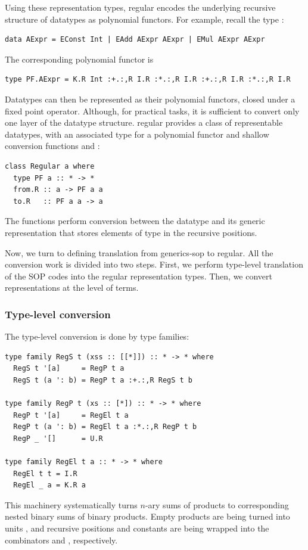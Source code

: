 \documentclass[sigplan,screen,review,anonymous]{acmart}
\begin{document}
Using these representation types, \textsf{regular} encodes the underlying recursive structure of datatypes as polynomial functors. For example, recall the type :
\begin{lstlisting}[style=fancy]
data AExpr = EConst Int | EAdd AExpr AExpr | EMul AExpr AExpr
\end{lstlisting}
The corresponding polynomial functor is
\begin{lstlisting}[style=fancy]
type PF.AExpr = K.R Int :+.:,R I.R :*.:,R I.R :+.:,R I.R :*.:,R I.R
\end{lstlisting}
Datatypes can then be represented as their polynomial functors, closed under a fixed point operator. Although, for practical tasks, it is sufficient to convert only one layer of the datatype structure. \textsf{regular} provides a  class of representable datatypes, with an associated type  for a polynomial functor and shallow conversion functions  and :
\begin{lstlisting}[style=fancy]
class Regular a where
  type PF a :: * -> *
  from.R :: a -> PF a a
  to.R   :: PF a a -> a
\end{lstlisting}
The functions perform conversion between the datatype  and its generic representation  that stores elements of type  in the recursive positions.

Now, we turn to defining translation from \textsf{generics-sop} to \textsf{regular}. All the conversion work is divided into two steps. First, we perform type-level translation of the SOP codes into the \textsf{regular} representation types. Then, we convert representations at the level of terms.

\subsubsection{Type-level conversion}

The type-level conversion is done by type families:
\begin{lstlisting}[style=fancy]
type family RegS t (xss :: [[*]]) :: * -> * where
  RegS t '[a]     = RegP t a
  RegS t (a ': b) = RegP t a :+.:,R RegS t b

type family RegP t (xs :: [*]) :: * -> * where
  RegP t '[a]     = RegEl t a
  RegP t (a ': b) = RegEl t a :*.:,R RegP t b
  RegP _ '[]      = U.R

type family RegEl t a :: * -> * where
  RegEl t t = I.R
  RegEl _ a = K.R a
\end{lstlisting}
This machinery systematically turns $n$-ary sums of products to corresponding nested binary sums of binary products. Empty products are being turned into units , and recursive positions and constants are being wrapped into the combinators  and , respectively.
\end{document}
